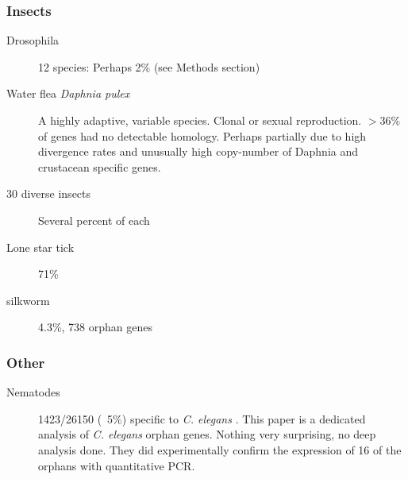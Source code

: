   \subsubsection{Insects}
    \begin{description}
        \item[Drosophila] 12 species: Perhaps 2\% (see Methods section)
            \cite{hahn_gene_2007}
        \item[Water flea \textit{Daphnia pulex}] A highly adaptive, variable
            species. Clonal or sexual reproduction. $>$36\% of genes had no
            detectable homology. Perhaps partially due to high divergence rates
            and unusually high copy-number of Daphnia and crustacean specific
            genes. \cite{colbourne_ecoresponsive_2011}
        \item[30 diverse insects] Several percent of each \cite{wissler_mechanisms_2013}
        \item[Lone star tick] 71\% \cite{gibson_why_2013}
        \item[silkworm] 4.3\%, 738 orphan genes \cite{sun_identification_2015}
    \end{description}

  \subsubsection{Other}
    \begin{description}
      \item[Nematodes] 1423/26150 (~5\%) specific to \textit{C. elegans}
        \cite{zhou_genome-wide_2015}. This paper is a dedicated analysis of
        \textit{C. elegans} orphan genes. Nothing very surprising, no deep
        analysis done. They did experimentally confirm the expression of 16
        of the orphans with quantitative PCR.
    \end{description}
